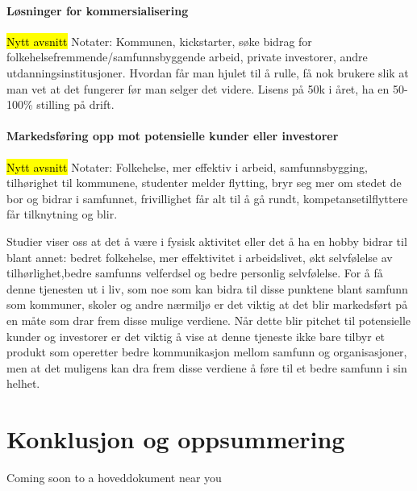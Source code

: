 \paragraph{Løsninger for kommersialisering}
\hl{Nytt avsnitt}
Notater:
Kommunen, kickstarter, søke bidrag for folkehelsefremmende/samfunnsbyggende arbeid, private investorer, andre utdanningsinstitusjoner. Hvordan får man hjulet til å rulle, få nok brukere slik at man vet at det fungerer før man selger det videre. Lisens på 50k i året, ha en 50-100\% stilling på drift.

\paragraph{Markedsføring opp mot potensielle kunder eller investorer}
\hl{Nytt avsnitt}
Notater:
Folkehelse, mer effektiv i arbeid, samfunnsbygging, tilhørighet til kommunene, studenter melder flytting, bryr seg mer om stedet de bor og bidrar i samfunnet, frivillighet får alt til å gå rundt, kompetansetilflyttere får tilknytning og blir.

Studier viser oss at det å være i fysisk aktivitet eller det å ha en hobby bidrar til blant annet: bedret folkehelse, mer effektivitet i arbeidslivet, økt selvfølelse av tilhørlighet,bedre samfunns velferdsel og bedre personlig selvfølelse. For å få denne tjenesten ut i liv, som noe som kan bidra til disse punktene blant samfunn som kommuner, skoler og andre nærmiljø er det viktig at det blir markedsført på en måte som drar frem disse mulige verdiene. Når dette blir pitchet til potensielle kunder og investorer er det viktig å vise at denne tjeneste ikke bare tilbyr et produkt som operetter bedre kommunikasjon mellom samfunn og organisasjoner, men at det muligens kan dra frem disse verdiene å føre til et bedre samfunn i sin helhet.


\section{Konklusjon og oppsummering}
Coming soon to a hoveddokument near you






